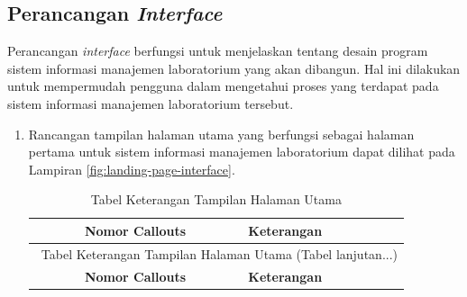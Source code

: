 \subsection{Perancangan \textit{Interface}}
Perancangan \textit{interface} berfungsi untuk menjelaskan tentang desain program sistem informasi manajemen laboratorium yang akan dibangun. Hal ini dilakukan untuk mempermudah pengguna dalam mengetahui proses yang terdapat pada sistem informasi manajemen laboratorium tersebut.

\begin{enumerate}
	\item Rancangan tampilan halaman utama yang berfungsi sebagai halaman pertama untuk sistem informasi manajemen laboratorium dapat dilihat pada Lampiran \ref{fig:landing-page-interface}.


	      \begin{longtable}{c p{}}
		      \caption{\selectfont Tabel Keterangan Tampilan Halaman Utama}                                                                                   \\
		      \hline
		      \textbf{Nomor Callouts} & \textbf{Keterangan}                                                                                                   \\
		      \hline
		      \endfirsthead

		      \multicolumn{2}{c}{\selectfont \thetable\ {Tabel Keterangan Tampilan Halaman Utama} \space (Tabel lanjutan...)}                                 \\
		      \hline
		      \textbf{Nomor Callouts} & \textbf{Keterangan}                                                                                                   \\
		      \hline
		      \endhead


\end{longtable}
\end{enumerate}
